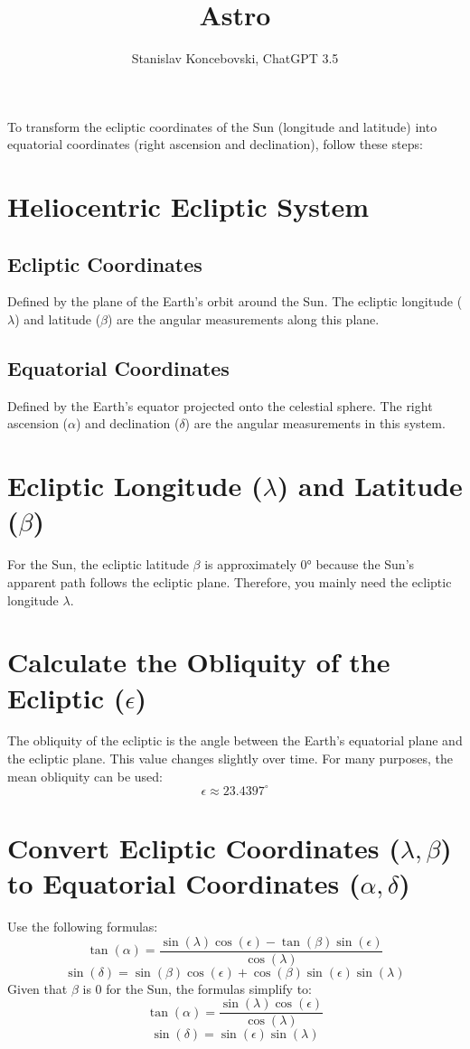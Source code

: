 \documentclass[12pt,a4paper]{article}
\author{Stanislav Koncebovski, ChatGPT 3.5}
\title{Astro}
\begin{document}
	\maketitle
	
	To transform the ecliptic coordinates of the Sun (longitude and latitude) into equatorial coordinates (right ascension and declination), follow these steps:
	
	\section{Heliocentric Ecliptic System}
		\subsection{Ecliptic Coordinates}
			Defined by the plane of the Earth's orbit around the Sun. The ecliptic longitude (\(\lambda\)) and latitude (\(\beta\)) are the angular measurements along this plane.
		\subsection{Equatorial Coordinates}
			Defined by the Earth's equator projected onto the celestial sphere. The right ascension (\(\alpha\)) and declination (\(\delta\)) are the angular measurements in this system.
	
	\section{Ecliptic Longitude (\(\lambda\)) and Latitude (\(\beta\))}
		For the Sun, the ecliptic latitude \(\beta\) is approximately 0° because the Sun's apparent path follows the ecliptic plane. Therefore, you mainly need the ecliptic longitude \(\lambda\).
	
	\section{Calculate the Obliquity of the Ecliptic (\(\epsilon\))}
		The obliquity of the ecliptic is the angle between the Earth's equatorial plane and the ecliptic plane. This value changes slightly over time. For many purposes, the mean obliquity can be used:
	\[
	\epsilon \approx 23.4397^\circ
	\]
	
	\section{Convert Ecliptic Coordinates (\(\lambda, \beta\)) to Equatorial Coordinates (\(\alpha, \delta\))}
		Use the following formulas:
	\[
	\tan(\alpha) = \frac{\sin(\lambda) \cos(\epsilon) - \tan(\beta) \sin(\epsilon)}{\cos(\lambda)}
	\]
	\[
	\sin(\delta) = \sin(\beta) \cos(\epsilon) + \cos(\beta) \sin(\epsilon) \sin(\lambda)
	\]
	Given that \(\beta\) is 0 for the Sun, the formulas simplify to:
	\[
	\tan(\alpha) = \frac{\sin(\lambda) \cos(\epsilon)}{\cos(\lambda)}
	\]
	\[
	\sin(\delta) = \sin(\epsilon) \sin(\lambda)
	\]
	
\end{document}
